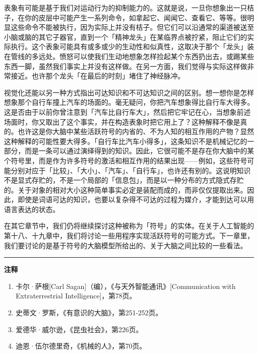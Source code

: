 \documentclass[
  12pt,
  twoside,
  openright,
  oldfontcommands,
]{memoir}
\begin{document}
表象有可能是基于我们对运动行为的抑制能力的。这就是说，一旦你想象出一只桔子，在你的皮层中可能产生一系列命令，如拿起它、闻闻它、查看它、等等。很明显这些命令不能被执行，因为实际上并没有桔子。但它们可以沿通常的渠道被送至小脑或脑的其它子器官，直到一个「精神龙头」在某临界点被拧紧，阻止它们的实际执行。这个表象可能具有或多或少的生动性和似真性，这取决于那个「龙头」装在管线的多远处。愤怒可以使我们生动地想象怎样捡起某个东西扔出去，或踢某些东西一脚，虽然我们事实上并没有这样做。在另一方面，我们觉得与实际这样做非常接近。也许那个龙头「在最后的时刻」堵住了神经脉冲。

视觉化还能以另一种方式指出可达知识和不可达知识之间的区别。想一想你是怎样想象那个自行车撞上汽车的场面的。毫无疑问，你把汽车想象得比自行车大得多。这是否由于以前你曾注意到「汽车比自行车大」，然后把它牢记在心，当想象前述场面时，你又取出了这个事实，并在构造表象时把它用上了？这种解释不像是真的。也许这是你大脑中某些活跃符号的内省的、不为人知的相互作用的产物？显然这种解释的可能性要大得多。「自行车比汽车小得多」，这条知识不是机械记忆的一部分，而是一条可以通过演绎得到的知识。因此，它很可能不是存在你大脑中的某个符号里，而是作为许多符号的激活和相互作用的结果出现------例如，这些符号可能分别对应于「比较」、「大小」、「汽车」、「自行车」，也许还有别的。这说明知识不是显式存贮的，不是一个局部的「信息包」，而是以一种分布的方式隐式存贮的。关于对象的相对大小这种简单事实必定是装配而成的，而非仅仅提取出来。因此，即使是词语可达的知识，也要以复杂得不可达的过程为媒介，才能到达可以用语言表达的状态。

在其它章节中，我们仍将继续探讨这种被称为「符号」的实体。在关于人工智能的第十八、十九章中，我们将讨论一些用程序实现活跃符号的可能方式。下一章里，我们要讨论的是基于符号的大脑模型所给出的、关于大脑之间比较的一些看法。

{\footnotesize\setlength{\parindent}{0pt}%
\noindent\textcolor{rulegray}{\rule{0.35\linewidth}{0.3pt}}\par\vspace{2pt}
\noindent\textbf{注释}\par\vspace{3pt}
\begin{enumerate}
\label{fn:Chapter11-1}{}
\item 卡尔·萨根[Carl Sagan]（编），《与天外智能通讯》[Communication with Extraterrestrial Intelligence]，第78页。
\label{fn:Chapter11-2}{}
\item 史蒂文·罗斯，《有意识的大脑》，第251-252页。
\label{fn:Chapter11-3}{}
\item 爱德华·威尔逊，《昆虫社会》，第226页。
\label{fn:Chapter11-4}{}
\item 迪恩·伍尔德里奇，《机械的人》，第70页。
\end{enumerate}
}
\end{document}
